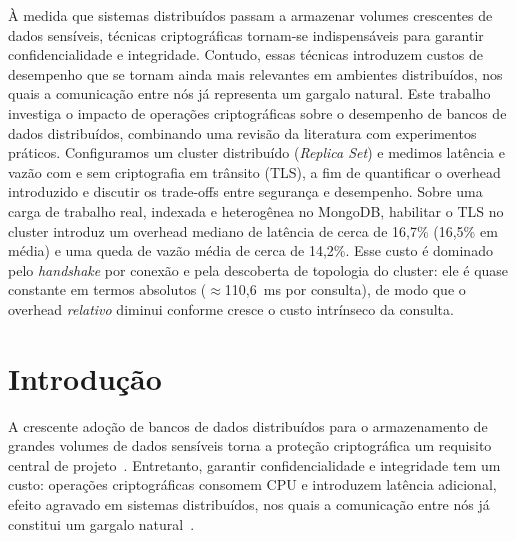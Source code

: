 \documentclass[12pt]{article}
\begin{document}
\begin{resumo}
  À medida que sistemas distribuídos passam a armazenar volumes crescentes de
  dados sensíveis, técnicas criptográficas tornam-se indispensáveis para
  garantir confidencialidade e integridade. Contudo, essas técnicas introduzem
  custos de desempenho que se tornam ainda mais relevantes em ambientes
  distribuídos, nos quais a comunicação entre nós já representa um gargalo
  natural. Este trabalho investiga o impacto de operações criptográficas sobre
  o desempenho de bancos de dados distribuídos, combinando uma revisão da
  literatura com experimentos práticos. Configuramos um cluster distribuído 
  (\emph{Replica Set}) e medimos latência e vazão com e sem criptografia em trânsito
  (TLS), a fim de quantificar o overhead introduzido e discutir os trade-offs
  entre segurança e desempenho. Sobre uma carga de trabalho real, indexada e 
  heterogênea no MongoDB, habilitar o TLS no cluster introduz um overhead mediano de
  latência de cerca de 16,7\% (16,5\% em média) e uma queda de vazão média de cerca de
  14,2\%. Esse custo é dominado pelo \emph{handshake} por conexão e pela descoberta de 
  topologia do cluster: ele é quase constante em termos absolutos ($\approx$110,6~ms 
  por consulta), de modo que o overhead \emph{relativo} diminui conforme cresce o 
  custo intrínseco da consulta.
\end{resumo}


\section{Introdução}
\label{sec:introducao}

A crescente adoção de bancos de dados distribuídos para o armazenamento de
grandes volumes de dados sensíveis torna a proteção criptográfica um requisito
central de projeto~\cite{fuller2017sok}. Entretanto, garantir confidencialidade
e integridade tem um custo: operações criptográficas consomem CPU e introduzem
latência adicional, efeito agravado em sistemas distribuídos, nos quais a
comunicação entre nós já constitui um gargalo natural~\cite{gilbert2002cap}.
\end{document}

